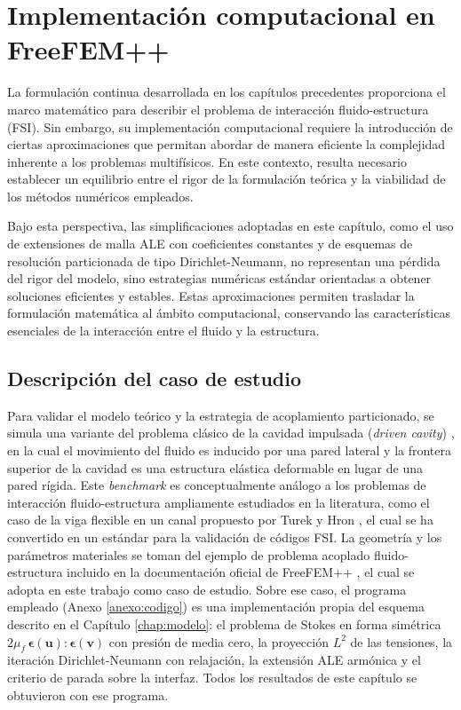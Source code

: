 \documentclass[12pt, letterpaper]{report}
\theoremstyle{definition}
\begin{document}
\chapter{Implementación computacional en FreeFEM++}
\label{chap:implementacion}

La formulación continua desarrollada en los capítulos precedentes proporciona el marco matemático para describir el problema de interacción fluido-estructura (FSI). Sin embargo, su implementación computacional requiere la introducción de ciertas aproximaciones que permitan abordar de manera eficiente la complejidad inherente a los problemas multifísicos. En este contexto, resulta necesario establecer un equilibrio entre el rigor de la formulación teórica y la viabilidad de los métodos numéricos empleados.

Bajo esta perspectiva, las simplificaciones adoptadas en este capítulo, como el uso de extensiones de malla ALE con coeficientes constantes y de esquemas de resolución particionada de tipo Dirichlet-Neumann, no representan una pérdida del rigor del modelo, sino estrategias numéricas estándar orientadas a obtener soluciones eficientes y estables. Estas aproximaciones permiten trasladar la formulación matemática al ámbito computacional, conservando las características esenciales de la interacción entre el fluido y la estructura.

\section{Descripción del caso de estudio}

Para validar el modelo teórico y la estrategia de acoplamiento particionado, se simula una variante del problema clásico de la cavidad impulsada (\textit{driven cavity}) \cite{ghia1982high}, en la cual el movimiento del fluido es inducido por una pared lateral y la frontera superior de la cavidad es una estructura elástica deformable en lugar de una pared rígida. Este \textit{benchmark} es conceptualmente análogo a los problemas de interacción fluido-estructura ampliamente estudiados en la literatura, como el caso de la viga flexible en un canal propuesto por Turek y Hron \cite{turek2006proposal}, el cual se ha convertido en un estándar para la validación de códigos FSI. La geometría y los parámetros materiales se toman del ejemplo de problema acoplado fluido-estructura incluido en la documentación oficial de FreeFEM++ \cite{manualfreefem}, el cual se adopta en este trabajo como caso de estudio. Sobre ese caso, el programa empleado (Anexo \ref{anexo:codigo}) es una implementación propia del esquema descrito en el Capítulo \ref{chap:modelo}: el problema de Stokes en forma simétrica $2\mu_f\,\boldsymbol{\epsilon}(\mathbf{u}):\boldsymbol{\epsilon}(\mathbf{v})$ con presión de media cero, la proyección $L^2$ de las tensiones, la iteración Dirichlet-Neumann con relajación, la extensión ALE armónica y el criterio de parada sobre la interfaz. Todos los resultados de este capítulo se obtuvieron con ese programa.
\end{document}
